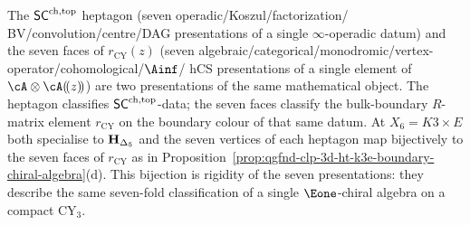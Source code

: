 \begin{remark}[Heptagon \texorpdfstring{$=$}{=} seven faces of \texorpdfstring{$r_{\mathrm{CY}}$}{r-CY}
identification]
\label{rem:qgfnd-clp-hidden-heptagon-seven-faces}%
The $\mathsf{SC}^{\mathrm{ch,top}}$ heptagon (seven operadic/Koszul/factorization/
BV/convolution/centre/DAG presentations of a single $\infty$-operadic
datum) and the seven faces of $r_{\mathrm{CY}}(z)$ (seven
algebraic/categorical/monodromic/vertex-operator/cohomological/$\Ainf$/
hCS presentations of a single element of $\cA\otimes\cA(\!(z)\!)$)
are two presentations of the same mathematical object. The heptagon
classifies $\mathsf{SC}^{\mathrm{ch,top}}$-data; the seven faces classify the
bulk-boundary $R$-matrix element $r_{\mathrm{CY}}$ on the boundary
colour of that same datum. At $X_6=K3\times E$ both specialise to
$\mathbf{H}_{\Delta_5}$ and the seven vertices of each heptagon map bijectively to
the seven faces of $r_{\mathrm{CY}}$ as in
Proposition~\ref{prop:qgfnd-clp-3d-ht-k3e-boundary-chiral-algebra}(d).
This bijection is rigidity of the seven presentations: they describe
the same seven-fold classification of a single
$\Eone$-chiral algebra on a compact CY$_3$.
\end{remark}

